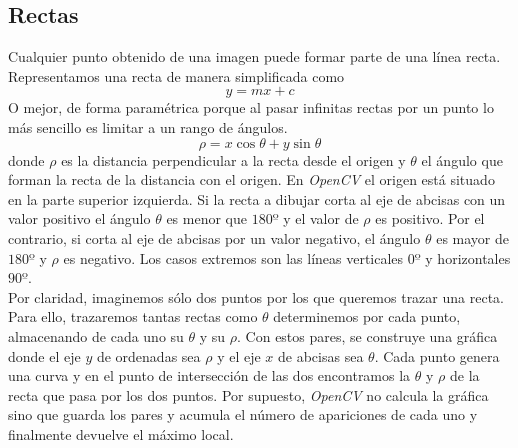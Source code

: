 \subsection{Rectas}
Cualquier punto obtenido de una imagen puede formar parte de una línea
recta. Representamos una recta de manera simplificada como
\begin{equation*}
  y = mx + c
\end{equation*}
O mejor, de forma paramétrica porque al pasar infinitas rectas por un
punto lo más sencillo es limitar a un rango de ángulos.
\begin{equation*}
  \rho = x \cos \theta + y \sin \theta
\end{equation*}
donde $\rho$ es la distancia perpendicular a la recta desde el origen y
$\theta$ el ángulo que forman la recta de la distancia con el
origen. En \emph{OpenCV} el origen está situado en la parte superior
izquierda. Si la recta a dibujar corta al eje de abcisas con un valor
positivo el ángulo $\theta$ es menor que $180º$ y el valor de $\rho$
es positivo. Por el contrario, si corta al eje de abcisas por un valor
negativo, el ángulo $\theta$ es mayor de $180º$ y $\rho$ es
negativo. Los casos extremos son las líneas verticales $0º$ y
horizontales $90º$.\\
Por claridad, imaginemos sólo dos puntos por los que queremos trazar
una recta. Para ello, trazaremos tantas rectas como $\theta$
determinemos por cada punto, almacenando de cada uno su $\theta$ y su
$\rho$. Con estos pares, se construye una gráfica donde el eje $y$ de
ordenadas sea $\rho$ y el eje $x$ de abcisas sea $\theta$. Cada punto
genera una curva y en el punto de intersección de las dos encontramos
la $\theta$ y $\rho$ de la recta que pasa por los dos puntos. Por
supuesto, \emph{OpenCV} no calcula la gráfica sino que guarda los
pares y acumula el número de apariciones de cada uno y finalmente
devuelve el máximo local.

